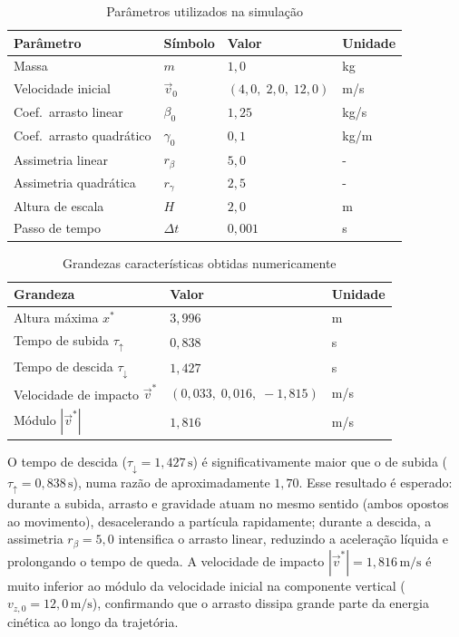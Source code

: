 \begin{table}[!htb]
    \centering
    \caption{Parâmetros utilizados na simulação}
    \label{tab:params-q6}
    \begin{tabular}{llll}
        \hline
        Parâmetro & Símbolo & Valor & Unidade \\
        \hline
        Massa                         & $m$           & $1{,}0$  & kg \\
        Velocidade inicial            & $\vec{v}_0$   & $(4{,}0,\;2{,}0,\;12{,}0)$ & m/s \\
        Coef.\ arrasto linear         & $\beta_0$     & $1{,}25$ & kg/s \\
        Coef.\ arrasto quadrático     & $\gamma_0$    & $0{,}1$  & kg/m \\
        Assimetria linear             & $r_\beta$     & $5{,}0$  & - \\
        Assimetria quadrática         & $r_\gamma$    & $2{,}5$  & - \\
        Altura de escala              & $H$           & $2{,}0$  & m \\
        Passo de tempo                & $\Delta t$    & $0{,}001$& s \\
        \hline
    \end{tabular}
\end{table}

\begin{table}[!htb]
    \centering
    \caption{Grandezas características obtidas numericamente}
    \label{tab:results-q6}
    \begin{tabular}{lll}
        \hline
        Grandeza & Valor & Unidade \\
        \hline
        Altura máxima $x^*$                  & $3{,}996$ & m \\
        Tempo de subida $\tau_\uparrow$      & $0{,}838$ & s \\
        Tempo de descida $\tau_\downarrow$   & $1{,}427$ & s \\
        Velocidade de impacto $\vec{v}^*$    & $(0{,}033,\;0{,}016,\;-1{,}815)$ & m/s \\
        Módulo $|\vec{v}^*|$                 & $1{,}816$ & m/s \\
        \hline
    \end{tabular}
\end{table}

O tempo de descida ($\tau_\downarrow = 1{,}427\,\text{s}$) é significativamente maior que o de subida ($\tau_\uparrow = 0{,}838\,\text{s}$), numa razão de aproximadamente $1{,}70$. Esse resultado é esperado: durante a subida, arrasto e gravidade atuam no mesmo sentido (ambos opostos ao movimento), desacelerando a partícula rapidamente; durante a descida, a assimetria $r_\beta = 5{,}0$ intensifica o arrasto linear, reduzindo a aceleração líquida e prolongando o tempo de queda. A velocidade de impacto $|\vec{v}^*| = 1{,}816\,\text{m/s}$ é muito inferior ao módulo da velocidade inicial na componente vertical ($v_{z,0} = 12{,}0\,\text{m/s}$), confirmando que o arrasto dissipa grande parte da energia cinética ao longo da trajetória.


